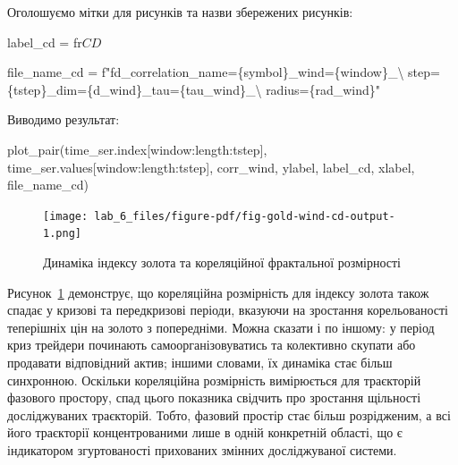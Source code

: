\documentclass[
  letterpaper,
]{report}
\newenvironment{Shaded}{\begin{snugshade}}{\end{snugshade}}
\newcommand{\CharTok}[1]{\textcolor[rgb]{0.13,0.47,0.30}{#1}}
\newcommand{\NormalTok}[1]{\textcolor[rgb]{0.00,0.23,0.31}{#1}}
\newcommand{\OperatorTok}[1]{\textcolor[rgb]{0.37,0.37,0.37}{#1}}
\newcommand{\SpecialCharTok}[1]{\textcolor[rgb]{0.37,0.37,0.37}{#1}}
\newcommand{\SpecialStringTok}[1]{\textcolor[rgb]{0.13,0.47,0.30}{#1}}
\newcommand{\VerbatimStringTok}[1]{\textcolor[rgb]{0.13,0.47,0.30}{#1}}
\begin{document}
Оголошуємо мітки для рисунків та назви збережених рисунків:

\begin{Shaded}
\begin{Highlighting}[]
\NormalTok{label\_cd }\OperatorTok{=} \VerbatimStringTok{fr\textquotesingle{}$CD$\textquotesingle{}}

\NormalTok{file\_name\_cd }\OperatorTok{=} \SpecialStringTok{f"fd\_correlation\_name=}\SpecialCharTok{\{}\NormalTok{symbol}\SpecialCharTok{\}}\SpecialStringTok{\_wind=}\SpecialCharTok{\{}\NormalTok{window}\SpecialCharTok{\}}\SpecialStringTok{\_}\CharTok{\textbackslash{}}
\SpecialStringTok{                step=}\SpecialCharTok{\{}\NormalTok{tstep}\SpecialCharTok{\}}\SpecialStringTok{\_dim=}\SpecialCharTok{\{}\NormalTok{d\_wind}\SpecialCharTok{\}}\SpecialStringTok{\_tau=}\SpecialCharTok{\{}\NormalTok{tau\_wind}\SpecialCharTok{\}}\SpecialStringTok{\_}\CharTok{\textbackslash{}}
\SpecialStringTok{                radius=}\SpecialCharTok{\{}\NormalTok{rad\_wind}\SpecialCharTok{\}}\SpecialStringTok{"}
\end{Highlighting}
\end{Shaded}

Виводимо результат:

\begin{Shaded}
\begin{Highlighting}[]
\NormalTok{plot\_pair(time\_ser.index[window:length:tstep],}
\NormalTok{          time\_ser.values[window:length:tstep],}
\NormalTok{          corr\_wind, }
\NormalTok{          ylabel, }
\NormalTok{          label\_cd,}
\NormalTok{          xlabel,}
\NormalTok{          file\_name\_cd)}
\end{Highlighting}
\end{Shaded}

\begin{figure}[H]

{\centering \texttt{[image: lab\_6\_files/figure-pdf/fig-gold-wind-cd-output-1.png]}

}

\caption{\label{fig-gold-wind-cd}Динаміка індексу золота та кореляційної
фрактальної розмірності}

\end{figure}

Рисунок~\ref{fig-gold-wind-cd} демонструє, що кореляційна розмірність
для індексу золота також спадає у кризові та передкризові періоди,
вказуючи на зростання корельованості теперішніх цін на золото з
попередніми. Можна сказати і по іншому: у період криз трейдери починають
самоорганізовуватись та колективно скупати або продавати відповідний
актив; іншими словами, їх динаміка стає більш синхронною. Оскільки
кореляційна розмірність вимірюється для траєкторій фазового простору,
спад цього показника свідчить про зростання щільності досліджуваних
траєкторій. Тобто, фазовий простір стає більш розрідженим, а всі його
траєкторії концентрованими лише в одній конкретній області, що є
індикатором згуртованості прихованих змінних досліджуваної системи.
\end{document}

